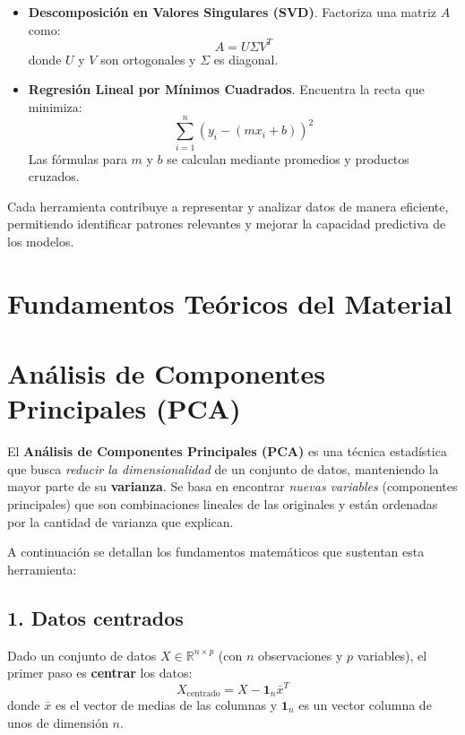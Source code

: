 \documentclass[12pt]{article}
\begin{document}
\begin{itemize}
                \item \textbf{Descomposición en Valores Singulares (SVD)}. Factoriza una matriz $A$ como:
                \[
                A = U \Sigma V^T
                \]
                donde $U$ y $V$ son ortogonales y $\Sigma$ es diagonal.
                
                \item \textbf{Regresión Lineal por Mínimos Cuadrados}. Encuentra la recta que minimiza:
                \[
                \sum_{i=1}^n (y_i - (m x_i + b))^2
                \]
                Las fórmulas para $m$ y $b$ se calculan mediante promedios y productos cruzados.
        \end{itemize}
        
        \vspace{1em}
        \noindent
        Cada herramienta contribuye a representar y analizar datos de manera eficiente, permitiendo identificar patrones relevantes y mejorar la capacidad predictiva de los modelos.
        
        \newpage
        \section{Fundamentos Teóricos del Material}
        \section*{Análisis de Componentes Principales (PCA)}
        \noindent
        El \textbf{Análisis de Componentes Principales (PCA)} es una técnica estadística que busca \emph{reducir la dimensionalidad} de un conjunto de datos, manteniendo la mayor parte de su \textbf{varianza}. Se basa en encontrar \emph{nuevas variables} (componentes principales) que son combinaciones lineales de las originales y están ordenadas por la cantidad de varianza que explican.
        
        \vspace{1em}
        \noindent
        A continuación se detallan los fundamentos matemáticos que sustentan esta herramienta:
        
        \subsection*{1. Datos centrados}
        
        Dado un conjunto de datos $ X \in \mathbb{R}^{n \times p} $ (con $ n $ observaciones y $ p $ variables), el primer paso es \textbf{centrar} los datos:
        \[
        X_{\text{centrado}} = X - \mathbf{1}_n \bar{x}^T
        \]
        donde $\bar{x}$ es el vector de medias de las columnas y $\mathbf{1}_n$ es un vector columna de unos de dimensión $ n $.
        
\end{document}
